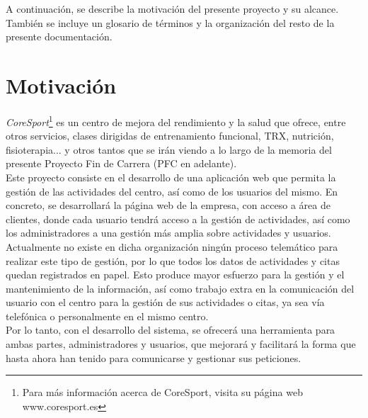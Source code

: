 


A continuación, se describe la motivación del presente proyecto y su alcance. También se incluye un glosario de términos y la organización del resto de la presente documentación.

\section{Motivación}\label{sec:introducción}

\textsl{CoreSport}\footnote{Para más información acerca de CoreSport, visita su página web www.coresport.es} es un centro de mejora del rendimiento y la salud que ofrece, entre otros servicios, clases dirigidas de entrenamiento funcional, TRX, nutrición, fisioterapia... y otros tantos que se irán viendo a lo largo de la memoria del presente Proyecto Fin de Carrera (PFC en adelante).
\\
Este proyecto consiste en el desarrollo de una aplicación web que permita la gestión de las actividades del centro, así como de los usuarios del mismo. En concreto, se desarrollará la página web de la empresa, con acceso a área de clientes, donde cada usuario tendrá acceso a la gestión de actividades, así como los administradores a una gestión más amplia sobre actividades y usuarios. 
\\

Actualmente no existe en dicha organización ningún proceso telemático para realizar este tipo de gestión, por lo que todos los datos de actividades y citas quedan registrados en papel. Esto produce mayor esfuerzo para la gestión y el mantenimiento de la información, así como trabajo extra en la comunicación del usuario con el centro para la gestión de sus actividades o citas, ya sea vía telefónica o personalmente en el mismo centro.
\\

Por lo tanto, con el desarrollo del sistema, se ofrecerá una herramienta para ambas partes, administradores y usuarios, que mejorará y facilitará la forma que hasta ahora han tenido para comunicarse y gestionar sus peticiones.


